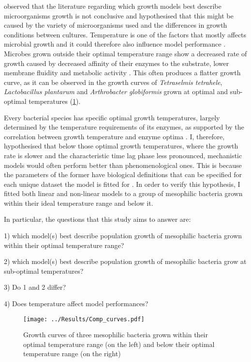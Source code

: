 \documentclass[a4paper]{article}
\begin{document}
\cite{pla2015comparison} observed that the literature regarding which growth models best describe microorganisms growth is not conclusive and hypothesised that this might be caused by the variety of microorganisms used and the differences in growth conditions between cultures. Temperature is one of the factors that mostly affects microbial growth and it could therefore also influence model performance \citep{Fujikawa2004ANL, doi:10.1080/10408398.2011.570463}. Microbes grown outside their optimal temperature range show a decreased rate of growth caused by decreased affinity of their enzymes to the substrate, lower membrane fluidity and metabolic activity \citep{10.1111/j.1574-6941.1999.tb00639.x, amato2009energy}. This often produces a flatter growth curve, as it can be observed in the growth curves of \textit{Tetraselmis tetrahele}, \textit{Lactobacillus plantarum} and \textit{Arthrobacter globiformis} grown at optimal and sub-optimal temperatures (\ref{fig:growthcurves}).\par 

Every bacterial species has specific optimal growth temperatures, largely determined by the temperature requirements of its enzymes, as supported by the correlation between growth temperature and enzyme optima \citep{engqvist2018correlating}. I, therefore, hypothesised that below those optimal growth temperatures, where the growth rate is slower and the characteristic time lag phase less pronounced, mechanistic models would often perform better than phenomenological ones. This is because the parameters of the former have biological definitions that can be specified for each unique dataset the model is fitted for \citep{liberles2013need}. In order to verify this hypothesis, I fitted both linear and non-linear models to a group of mesophilic bacteria grown within their ideal temperature range and below it. \par
In particular, the questions that this study aims to answer are: \par
1) which model(s) best describe population growth of mesophilic bacteria grown within their optimal temperature range?
\par
2) which model(s) best describe population growth of mesophilic bacteria grow at sub-optimal temperatures?
\par
3) Do 1 and 2 differ? 
\par
4) Does temperature affect model performances?

\begin{figure}
    \centering
    \texttt{[image: ../Results/Comp\_curves.pdf]}
    \caption{Growth curves of three mesophilic bacteria grown within their optimal temperature range (on the left) and below their optimal temperature range (on the right)}
    \label{fig:growthcurves}
\end{figure}
\end{document}
